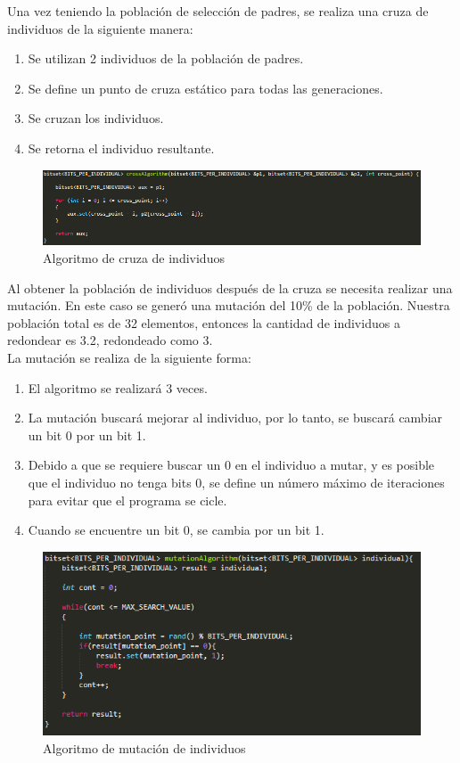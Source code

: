 \documentclass[11pt,letterpaper]{article}
\begin{document}
Una vez teniendo la población de selección de padres, se realiza una cruza de individuos de la siguiente manera:

\begin{enumerate}
	\item Se utilizan 2 individuos de la población de padres.
	\item Se define un punto de cruza estático para todas las generaciones.
	\item Se cruzan los individuos.
	\item Se retorna el individuo resultante.
\end{enumerate}

\begin{figure}[H]
	\centering
	\includegraphics[scale = .8]{images/cruza}
	\caption{Algoritmo de cruza de individuos}
\end{figure}

Al obtener la población de individuos después de la cruza se necesita realizar una mutación. En este caso se generó una mutación del 10\% de la población. Nuestra población total es de 32 elementos, entonces la cantidad de individuos a redondear es 3.2, redondeado como 3.\\

La mutación se realiza de la siguiente forma:
\begin{enumerate}
	\item El algoritmo se realizará 3 veces.
	\item La mutación buscará mejorar al individuo, por lo tanto, se buscará cambiar un bit 0 por un bit 1.
	\item Debido a que se requiere buscar un 0 en el individuo a mutar, y es posible que el individuo no tenga bits 0, se define un número máximo de iteraciones para evitar que el programa se cicle.
	\item Cuando se encuentre un bit 0, se cambia por un bit 1.
\end{enumerate}

\begin{figure}[H]
	\centering
	\includegraphics[scale = 1]{images/mutacion}
	\caption{Algoritmo de mutación de individuos}
\end{figure}
\end{document}
